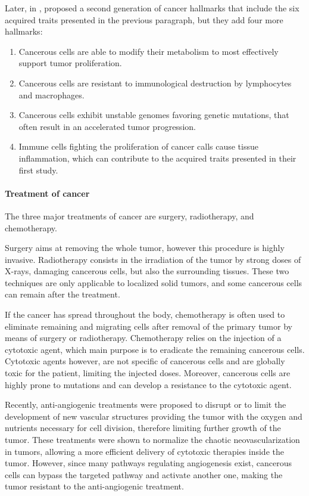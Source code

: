 Later, in \citeyear{Hanahan:2011gu}, \citet{Hanahan:2011gu} proposed a second generation of cancer hallmarks that include the six acquired traits presented in the previous paragraph, but they add four more hallmarks:
\begin{enumerate}
    \item Cancerous cells are able to modify their metabolism to most effectively support tumor proliferation.
    \item Cancerous cells are resistant to immunological destruction by lymphocytes and macrophages.
    \item Cancerous cells exhibit unstable genomes favoring genetic mutations, that often result in an accelerated tumor progression.
    \item Immune cells fighting the proliferation of cancer calls cause tissue inflammation, which can contribute to the acquired traits presented in their first study.
\end{enumerate}

\paragraph{Treatment of cancer}
\label{sec:IntroCancerTreatment}
The three major treatments of cancer are surgery, radiotherapy, and chemotherapy.

Surgery aims at removing the whole tumor, however this procedure is highly invasive.
Radiotherapy consists in the irradiation of the tumor by strong doses of X-rays, damaging cancerous cells, but also the surrounding tissues. 
These two techniques are only applicable to localized solid tumors, and some cancerous cells can remain after the treatment.

If the cancer has spread throughout the body, chemotherapy is often used to eliminate remaining and migrating cells after removal of the primary tumor by means of surgery or radiotherapy.
Chemotherapy relies on the injection of a cytotoxic agent, which main purpose is to eradicate the remaining cancerous cells.
Cytotoxic agents however, are not specific of cancerous cells and are globally toxic for the patient, limiting the injected doses.
Moreover, cancerous cells are highly prone to mutations and can develop a resistance to the cytotoxic agent.

Recently, anti-angiogenic treatments were proposed to disrupt or to limit the development of new vascular structures providing the tumor with the oxygen and nutrients necessary for cell division, therefore limiting further growth of the tumor. 
These treatments were shown to normalize the chaotic neovascularization in tumors, allowing a more efficient delivery of cytotoxic therapies inside the tumor. %
However, since many pathways regulating angiogenesis exist, cancerous cells can bypass the targeted pathway and activate another one, making the tumor resistant to the anti-angiogenic treatment.

